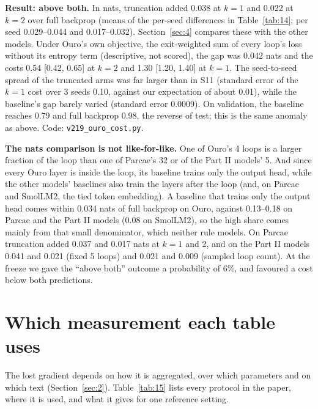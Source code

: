\documentclass[10pt]{article}
\begin{document}
\textbf{Result: above both.} In nats, truncation added 0.038 at $k = 1$ and 0.022 at $k = 2$ over full backprop (means of the per-seed differences in Table~\ref{tab:14}; per seed 0.029--0.044 and 0.017--0.032). Section~\ref{sec:4} compares these with the other models. Under Ouro's own objective, the exit-weighted sum of every loop's loss without its entropy term (descriptive, not scored), the gap was 0.042 nats and the costs 0.54 [0.42, 0.65] at $k = 2$ and 1.30 [1.20, 1.40] at $k = 1$. The seed-to-seed spread of the truncated arms was far larger than in S11 (standard error of the $k = 1$ cost over 3 seeds 0.10, against our expectation of about 0.01), while the baseline's gap barely varied (standard error 0.0009). On validation, the baseline reaches 0.79 and full backprop 0.98, the reverse of test; this is the same anomaly as above. Code: \texttt{v219\_ouro\_cost.py}.

\textbf{The nats comparison is not like-for-like.} One of Ouro's 4 loops is a larger fraction of the loop than one of Parcae's 32 or of the Part II models' 5. And since every Ouro layer is inside the loop, its baseline trains only the output head, while the other models' baselines also train the layers after the loop (and, on Parcae and SmolLM2, the tied token embedding). A baseline that trains only the output head comes within 0.034 nats of full backprop on Ouro, against 0.13--0.18 on Parcae and the Part II models (0.08 on SmolLM2), so the high share comes mainly from that small denominator, which neither rule models. On Parcae truncation added 0.037 and 0.017 nats at $k = 1$ and 2, and on the Part II models 0.041 and 0.021 (fixed 5 loops) and 0.021 and 0.009 (sampled loop count). At the freeze we gave the ``above both'' outcome a probability of 6\%, and favoured a cost below both predictions.

\section{Which measurement each table uses}\label{app:L}

The lost gradient depends on how it is aggregated, over which parameters and on which text (Section~\ref{sec:2}). Table~\ref{tab:15} lists every protocol in the paper, where it is used, and what it gives for one reference setting.
\end{document}

